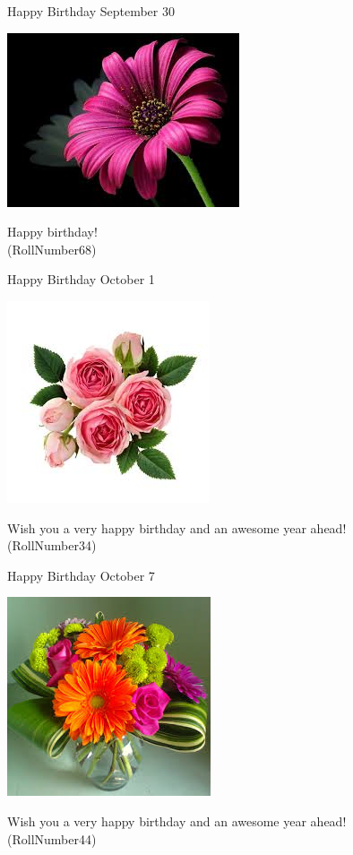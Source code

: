 \documentclass[table, landscape]{beamer}
\begin{document}
\begin{frame}{\color{red}Happy Birthday }
{September 30}
\begin{center}
\includegraphics[height=0.5\textheight]{flowers/f2.jpeg}

Happy birthday! \\ \vspace{0.5cm}{\Large name61} (RollNumber68)
\end{center}
\end{frame}
\begin{frame}{\color{red}Happy Birthday }
{October 1}
\begin{center}
\includegraphics[height=0.5\textheight]{flowers/f5.jpeg}

Wish you a very happy birthday and an awesome year ahead! \\ \vspace{0.5cm}{\Large name29} (RollNumber34)
\end{center}
\end{frame}
\begin{frame}{\color{blue}Happy Birthday }
{October 7}
\begin{center}
\includegraphics[height=0.5\textheight]{flowers/f8.jpeg}

Wish you a very happy birthday and an awesome year ahead! \\ \vspace{0.5cm}{\Large name37} (RollNumber44)
\end{center}
\end{frame}
\end{document}
